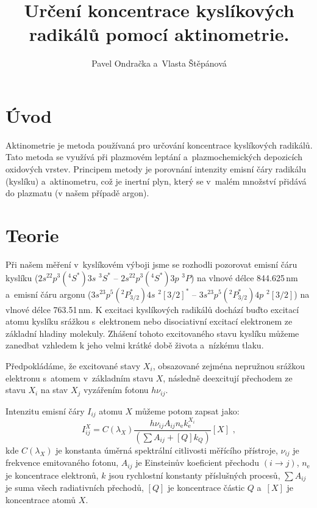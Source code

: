 \documentclass[12pt]{article}
\begin{document}
\title{Určení koncentrace kyslíkových radikálů pomocí aktinometrie.}
\author{Pavel Ondračka a~Vlasta Štěpánová}
\maketitle

\section{Úvod}
Aktinometrie je metoda používaná pro určování koncentrace kyslíkových radikálů. Tato metoda se využívá při plazmovém leptání a~plazmochemických depozicích oxidových vrstev. Principem metody je porovnání intenzity emisní čáry radikálu (kyslíku) a~aktinometru, což je inertní plyn, který se v~malém množství přidává do plazmatu (v našem případě argon).

\section{Teorie}
Při našem měření v~kyslíkovém výboji jsme se rozhodli pozorovat emisní čáru kyslíku ($2s^22p^3(^4S^*)3s$ $^3S^*$ -- $2s^22p^3(^4S^*)3p$ $^3P$) na vlnové délce 844.625\,nm a~emisní čáru argonu ($3s^23p^5(^2P^*_{3/2})4s$ $^2[3/2]^*$ -- $3s^23p^5(^2P^*_{3/2})4p$ $^2[3/2]$) na vlnové délce 763.51\,nm. K excitaci kyslíkových radikálů dochází buďto excitací atomu kyslíku srážkou s~elektronem nebo disociativní excitací elektronem ze základní hladiny molekuly. Zhášení tohoto excitovaného stavu kyslíku můžeme zanedbat vzhledem k jeho velmi krátké době života a~nízkému tlaku. 

Předpokládáme, že excitované stavy $X_i$, obsazované zejména nepružnou srážkou elektronu s~atomem v~základním stavu $X$, následně deexcitují přechodem ze stavu $X_i$ na stav $X_j$ vyzářením fotonu $h\nu_{ij}$.

Intenzitu emisní čáry $I_{ij}$ atomu $X$ můžeme potom zapsat jako:
%
\begin{equation}
I_{ij}^X = C (\lambda_X) \frac{h \nu_{ij} A_{ij} n_\mathrm{e} k_\mathrm{e}^{X_i} } { ( \sum{A_{ij} + [Q] k_{Q}} )} [X] \,\, \mathrm{,} \label{i1}
\end{equation}
%
kde $C (\lambda_X)$ je konstanta úměrná spektrální citlivosti měřícího přístroje, $\nu_{ij}$ je frekvence emitovaného fotonu, $A_{ij}$ je Einsteinův koeficient přechodu $(i \rightarrow j)$, $n_\mathrm{e}$ je koncentrace elektronů, $k$ jsou rychlostní konstanty příslušných procesů, $\sum{A_{ij}}$ je suma všech radiativních přechodů, $[Q]$ je koncentrace částic $Q$ a~$[X]$ je koncentrace atomů $X$. 
\end{document}

